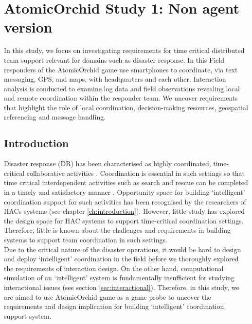 \chapter{AtomicOrchid Study 1: Non agent version}\label{ch:mathtest} %
In this study, we focus on investigating requirements for time critical distributed team support relevant for domains such as disaster response. In this Field responders of the AtomicOrchid game use smartphones to coordinate, via text messaging, GPS, and maps, with headquarters and each other. Interaction analysis is conducted to examine log data and field observations revealing local and remote coordination within the responder team. We uncover requirements that highlight the role of local coordination, decision-making resources, geospatial referencing and message handling. \\


\section{Introduction}
Disaster response (DR) has been characterised as highly coordinated, time-critical collaborative activities  \cite{Mendonca2007}. Coordination is essential in such settings so that time critical interdependent activities such as search and rescue can be completed in a timely and satisfactory manner \cite{Bradshaw2011}. Opportunity space for building `intelligent' coordination support for  such activities has been recognised by the researchers of HACs systems (see chapter \ref{ch:introduction}). However, little study has explored the  design space for HAC systems to support time-critical coordination settings. Therefore, little is known about the challenges and requirements in building systems to support team coordination in such settings.\\

Due to the critical nature of the disaster operations, it would be hard to design and deploy `intelligent' coordination in the field before we thoroughly explored the requirements of interaction design. On the other hand, computational simulation of an `intelligent' system is fundamentally insufficient for studying interactional issues (see section \ref{sec:interactional}). Therefore, in this study, we are aimed to use AtomicOrchid game as a game probe to uncover the requirements and design implication for building `intelligent' coordination support system. \\

